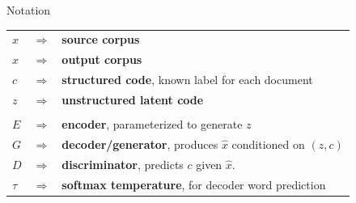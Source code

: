 \documentclass{beamer}
\begin{document}
\begin{frame}{Notation}
	\large
	\begin{tabular}{ l c l }
		$x$       & $\Rightarrow$ & \textbf{source corpus}                                                 \\
		$\hat{x}$ & $\Rightarrow$ & \textbf{output corpus}                                                 \\
		$c$       & $\Rightarrow$ & \textbf{structured code}, known label for each document                \\
		$z$       & $\Rightarrow$ & \textbf{unstructured latent code}                                      \\
		\\
		$E$       & $\Rightarrow$ & \textbf{encoder}, parameterized to generate $z$                        \\
		$G$       & $\Rightarrow$ & \textbf{decoder/generator}, produces $\hat{x}$ conditioned on $(z, c)$ \\
		$D$       & $\Rightarrow$ & \textbf{discriminator}, predicts $c$ given $\hat{x}$.                  \\
		$\tau$    & $\Rightarrow$ & \textbf{softmax temperature}, for decoder word prediction              \\
	\end{tabular}
\end{frame}
\end{document}
